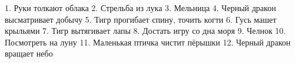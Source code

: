 1. Руки толкают облака
2. Стрельба из лука 
3. Мельница
4. Черный дракон высматривает добычу
5. Тигр прогибает спину, точить когти
6. Гусь машет крыльями
7. Тигр вытягивает лапы
8. Достать игру со дна моря
9. Челнок
10. Посмотреть на луну
11. Маленькая птичка чистит пёрышки 
12. Черный дракон вращает небо
